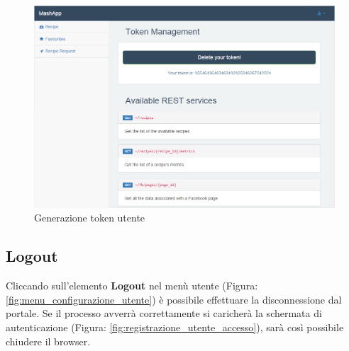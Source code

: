 		\begin{figure}[H]
			\centering
			\centerline{\includegraphics[width=14cm]{images/token_generate.png}}
			\caption{Generazione token utente}
			\label{fig:token_generate}
		\end{figure}


	\subsection{Logout} %
	\label{sec:logout}
		Cliccando sull'elemento \textbf{Logout} nel menù utente (Figura: \ref{fig:menu_configurazione_utente}) è possibile effettuare la disconnessione dal portale.\newline
		Se il processo avverrà correttamente si caricherà la schermata di autenticazione (Figura: \ref{fig:registrazione_utente_accesso}), sarà così possibile chiudere il browser.		


